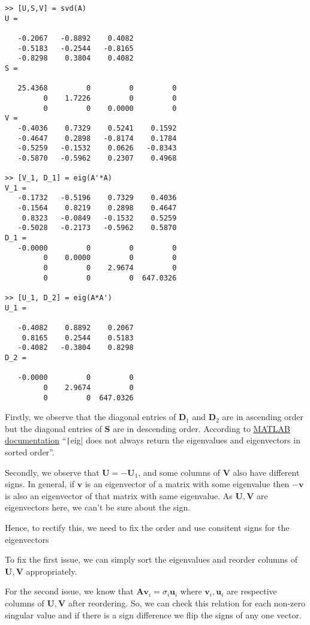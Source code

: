 \documentclass[a4paper,landscape]{article}
\begin{document}
\begin{enumerate}[(a)]
\begin{verbatim}
>> [U,S,V] = svd(A)
U =

   -0.2067   -0.8892    0.4082
   -0.5183   -0.2544   -0.8165
   -0.8298    0.3804    0.4082
S =

   25.4368         0         0         0
         0    1.7226         0         0
         0         0    0.0000         0
V =
   -0.4036    0.7329    0.5241    0.1592
   -0.4647    0.2898   -0.8174    0.1784
   -0.5259   -0.1532    0.0626   -0.8343
   -0.5870   -0.5962    0.2307    0.4968

>> [V_1, D_1] = eig(A'*A)
V_1 =
   -0.1732   -0.5196    0.7329    0.4036
   -0.1564    0.8219    0.2898    0.4647
    0.8323   -0.0849   -0.1532    0.5259
   -0.5028   -0.2173   -0.5962    0.5870
D_1 =
   -0.0000         0         0         0
         0    0.0000         0         0
         0         0    2.9674         0
         0         0         0  647.0326

>> [U_1, D_2] = eig(A*A')
U_1 =

   -0.4082    0.8892    0.2067
    0.8165    0.2544    0.5183
   -0.4082   -0.3804    0.8298
D_2 =

   -0.0000         0         0
         0    2.9674         0
         0         0  647.0326
\end{verbatim}
Firstly, we observe that the diagonal entries of $\bm{D}_1$ and $\bm{D}_2$ are in ascending order but the diagonal entries of $\bm{S}$ are in descending order. According to \href{https://in.mathworks.com/help/matlab/ref/eig.html}{MATLAB documentation} ``\texttt|eig| does not always return the eigenvalues and eigenvectors in sorted order''.

Secondly, we observe that $\bm{U} = -\bm{U}_1$, and some columns of $\bm{V}$ also have different signs. In general, if $\bm{v}$ is an eigenvector of a matrix with some eigenvalue then $-\bm{v}$ is also an eigenvector of that matrix with same eigenvalue. As $\bm{U}, \bm{V}$ are eigenvectors here, we can't be sure about the sign.

Hence, to rectify this, we need to fix the order and use consitent signs for the eigenvectors

To fix the first issue, we can simply sort the eigenvalues and reorder columns of $\bm{U}, \bm{V}$ appropriately.

For the second issue, we know that $\bm{A}\bm{v}_i=\sigma_i\bm{u}_i$ where $\bm{v}_i, \bm{u}_i$ are respective columns of $\bm{U}, \bm{V}$ after reordering. So, we can check this relation for each non-zero singular value and if there is a sign difference we flip the signs of any one vector.


\end{enumerate}
\end{document}
